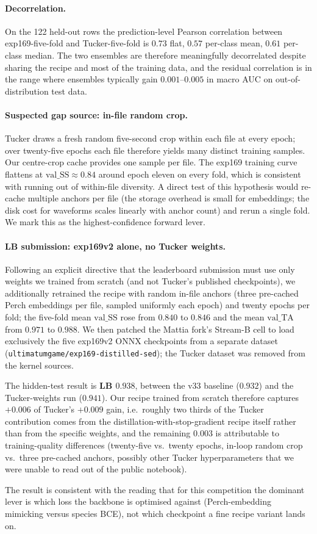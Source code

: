 \paragraph{Decorrelation.}
On the 122 held-out rows the prediction-level Pearson correlation
between exp169-five-fold and Tucker-five-fold is $0.73$ flat,
$0.57$ per-class mean, $0.61$ per-class median. The two ensembles
are therefore meaningfully decorrelated despite sharing the
recipe and most of the training data, and the residual correlation
is in the range where ensembles typically gain $0.001$--$0.005$ in
macro AUC on out-of-distribution test data.

\paragraph{Suspected gap source: in-file random crop.}
Tucker draws a fresh random five-second crop within each file at
every epoch; over twenty-five epochs each file therefore yields
many distinct training samples. Our centre-crop cache provides one
sample per file. The exp169 training curve flattens at
$\text{val\_SS} \approx 0.84$ around epoch eleven on every fold,
which is consistent with running out of within-file diversity. A
direct test of this hypothesis would re-cache multiple anchors per
file (the storage overhead is small for embeddings; the disk cost
for waveforms scales linearly with anchor count) and rerun a
single fold. We mark this as the highest-confidence forward lever.

\paragraph{LB submission: exp169v2 alone, no Tucker weights.}
Following an explicit directive that the leaderboard submission
must use only weights we trained from scratch (and not Tucker's
published checkpoints), we additionally retrained the recipe with
random in-file anchors (three pre-cached Perch embeddings per file,
sampled uniformly each epoch) and twenty epochs per fold; the
five-fold mean $\text{val\_SS}$ rose from $0.840$ to $0.846$ and
the mean $\text{val\_TA}$ from $0.971$ to $0.988$. We then patched
the Mattia fork's Stream-B cell to load exclusively the five
exp169v2 ONNX checkpoints from a separate dataset
(\texttt{ultimatumgame/exp169-distilled-sed}); the Tucker dataset
was removed from the kernel sources.

The hidden-test result is \textbf{LB $\mathbf{0.938}$}, between
the v33 baseline ($0.932$) and the Tucker-weights run
($0.941$). Our recipe trained from scratch therefore captures
$+0.006$ of Tucker's $+0.009$ gain, i.e.\ roughly two thirds of
the Tucker contribution comes from the distillation-with-stop-gradient
recipe itself rather than from the specific weights, and the
remaining $0.003$ is attributable to training-quality differences
(twenty-five vs.\ twenty epochs, in-loop random crop vs.\ three
pre-cached anchors, possibly other Tucker hyperparameters that we
were unable to read out of the public notebook).

The result is consistent with the reading that for this
competition the dominant lever is which loss the backbone is
optimised against (Perch-embedding mimicking versus species BCE),
not which checkpoint a fine recipe variant lands on.
